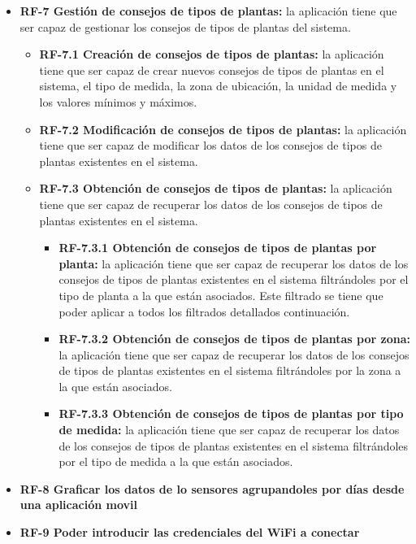 \begin{itemize}
        \item \textbf{RF-7 Gestión de consejos de tipos de plantas:} la aplicación tiene que ser capaz de gestionar los consejos de tipos de plantas del sistema.
            \begin{itemize}
                \item \textbf{RF-7.1 Creación de consejos de tipos de plantas:} la aplicación tiene que ser capaz de crear nuevos consejos de tipos de plantas en el sistema, el tipo de medida, la zona de ubicación,  la unidad de medida y los valores mínimos y máximos.
                \item \textbf{RF-7.2 Modificación de consejos de tipos de plantas:} la aplicación tiene que ser capaz de modificar los datos de los consejos de tipos de plantas existentes en el sistema.
    			\item \textbf{RF-7.3 Obtención de consejos de tipos de plantas:} la aplicación tiene que ser capaz de recuperar los datos de los consejos de tipos de plantas existentes en el sistema.
                \begin{itemize}
                    \item \textbf{RF-7.3.1 Obtención de consejos de tipos de plantas por planta:} la aplicación tiene que ser capaz de recuperar los datos de los consejos de tipos de plantas existentes en el sistema filtrándoles por el tipo de planta a la que están asociados. Este filtrado se tiene que poder aplicar a todos los filtrados detallados continuación. 
    				\item \textbf{RF-7.3.2 Obtención de consejos de tipos de plantas por zona:} la aplicación tiene que ser capaz de recuperar los datos de los consejos de tipos de plantas existentes en el sistema filtrándoles por la zona a la que están asociados.
    				\item \textbf{RF-7.3.3 Obtención de consejos de tipos de plantas por tipo de medida:} la aplicación tiene que ser capaz de recuperar los datos de los consejos de tipos de plantas existentes en el sistema filtrándoles por el tipo de medida a la que están asociados.
                \end{itemize}
            \end{itemize}
        \item \textbf{RF-8 Graficar los datos de lo sensores agrupandoles por días desde una aplicación movil}
        \item \textbf{RF-9 Poder introducir las credenciales del WiFi a conectar }
    \end{itemize}
    
